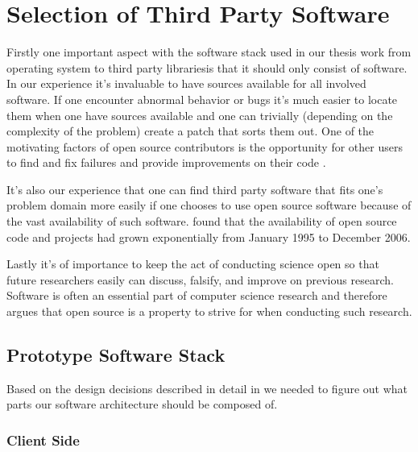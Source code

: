 \chapter{Selection of Third Party Software}
\label{chapter:selection.of.third.party.software}

Firstly one important aspect with the software stack used in our thesis work
\dash{}from operating system to third party libraries\dash{}is
that it should only consist of 
software. In our experience it's
invaluable to have sources available for all involved software. If one
encounter abnormal behavior or bugs it's much easier to locate them when one
have sources available and one can trivially (depending on the complexity of
the problem) create a patch that sorts them out. One of the motivating factors
of open source contributors is the opportunity for other users to find and fix
failures and provide improvements on their code \citep[p.~87]{hippel05}.

It's also our experience that one can find third party software that fits
one's problem domain more easily if one chooses to use open source software
because of the vast availability of such software.
\citet{deshpande08} found that the availability of open source
code and projects had grown exponentially from January 1995 to December 2006.

Lastly it's of importance to keep the act of conducting science open so that
future researchers easily can discuss, falsify, and improve on previous
research. Software is often an essential part of computer science research and
\citet[p.~430]{kelty05} therefore argues that open source
is a property to strive for when conducting such research.

\section{Prototype Software Stack}

Based on the design decisions described in detail in
we needed to figure out what parts
our software architecture should be composed of. 

\subsection{Client Side}

